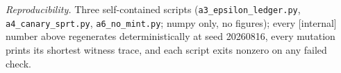 \documentclass[11pt,a4paper]{article}
\begin{document}
\vspace{0.4em}
\noindent\emph{Reproducibility.} Three self-contained scripts (\texttt{a3\_epsilon\_ledger.py}, \texttt{a4\_canary\_sprt.py}, \texttt{a6\_no\_mint.py}; numpy only, no figures); every [internal] number above regenerates deterministically at seed 20260816, every mutation prints its shortest witness trace, and each script exits nonzero on any failed check.
\end{document}
